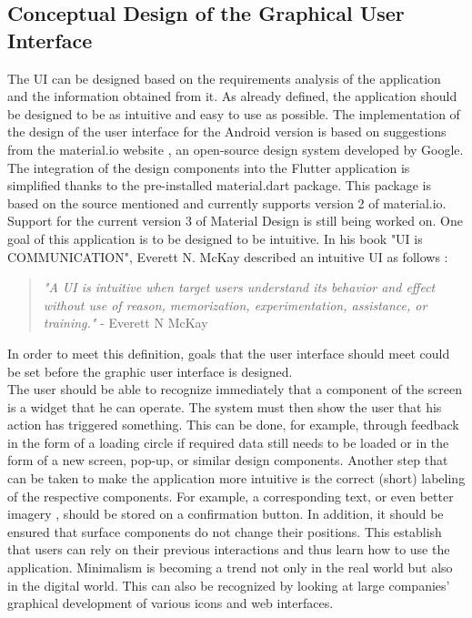 \subsection{Conceptual Design of the Graphical User Interface}
The UI can be designed based on the requirements analysis of the application and the information obtained from it. As already defined, the application should be designed to be as intuitive and easy to use as possible. The implementation of the design of the user interface for the Android version is based on suggestions from the material.io website \cite{.materialio}, an open-source design system developed by Google. The integration of the design components into the Flutter application is simplified thanks to the pre-installed material.dart package. This package is based on the source mentioned and currently supports version 2 of material.io. Support for the current version 3 of Material Design is still being worked on.
\noindent
One goal of this application is to be designed to be intuitive. In his book "UI is COMMUNICATION", Everett N. McKay described an intuitive UI as follows \cite{.mckay}: 
\begin{quote}
	\textit{"A UI is intuitive when target users understand its behavior and effect without use of reason, memorization, experimentation, assistance, or training."} - Everett N McKay \cite[p. 22]{.mckay}
\end{quote}
In order to meet this definition, goals that the user interface should meet could be set before the graphic user interface is designed.\\
\noindent
The user should be able to recognize immediately that a component of the screen is a widget that he can operate. The system must then show the user that his action has triggered something. This can be done, for example, through feedback in the form of a loading circle if required data still needs to be loaded or in the form of a new screen, pop-up, or similar design components. \cite{.mckay} Another step that can be taken to make the application more intuitive is the correct (short) labeling of the respective components. For example, a corresponding text, or even better imagery \cite[p. 172]{.essui}, should be stored on a confirmation button. In addition, it should be ensured that surface components do not change their positions. This establish that users can rely on their previous interactions and thus learn how to use the application. Minimalism is becoming a trend not only in the real world but also in the digital world. This can also be recognized by looking at large companies' graphical development of various icons and web interfaces.
